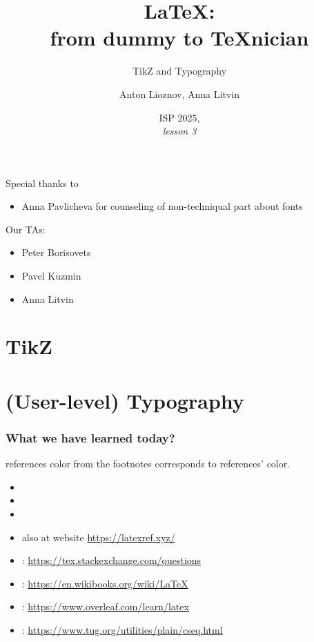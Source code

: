 \documentclass[aspectratio=169]{beamer}
\title{\LaTeX:\\ \Large from dummy to \TeX nician}
\subtitle{TikZ and Typography}
\author{Anton Lioznov, Anna Litvin}
\institute{Skoltech}
\date{ISP 2025,\\ \textit{lesson 3}}
\begin{document}

\begin{frame}{Special thanks to}\relax
     \begin{itemize}
         \item Anna Pavlicheva for counseling of non-techniqual part about fonts
     \end{itemize}
     Our TAs:
     \begin{itemize}
         \item Peter Borisovets
         \item Pavel Kuzmin
         \item Anna Litvin
     \end{itemize}

\end{frame}


\section{TikZ}



\section{(User-level) Typography}



\progressend


\begin{frame}\frametitle{What we have learned today?}\relax
    \tableofcontents
\end{frame}

\begin{frame}[allowframebreaks]{references}
color from the footnotes corresponds to references' color.
    \begin{itemize}
        \item {}
        \item {}
        \item {}
        \item {} also at website \url{https://latexref.xyz/}
        \item {} : \url{https://tex.stackexchange.com/questions}
        \item {} : \url{https://en.wikibooks.org/wiki/LaTeX}
        \item {} : \url{https://www.overleaf.com/learn/latex}
        \item {} : \url{https://www.tug.org/utilities/plain/cseq.html}
    \end{itemize}
\end{frame}
\end{document}
